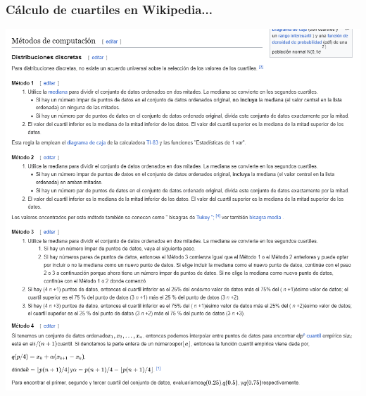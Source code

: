 \documentclass[aspectratio=169,12pt]{beamer}
\begin{document}

\begin{frame}
\frametitle{Cálculo de cuartiles en Wikipedia...}

\begin{center}
\includegraphics[scale=.3]{clase4-cuartiles.png}
\end{center}

\end{frame}


%
%
%

\end{document}

